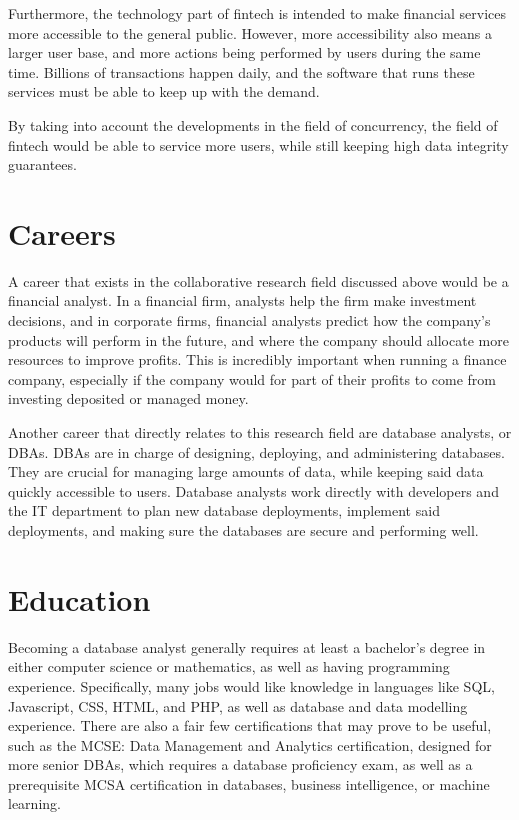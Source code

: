 \documentclass[jou]{apa7}
\begin{document}
Furthermore, the technology part of fintech is intended to make financial services more accessible to the general public.
However, more accessibility also means a larger user base,
and more actions being performed by users during the same time.
Billions of transactions happen daily,
and the software that runs these services must be able to keep up with the demand.
\autocite{foggSoftwareTestingFintech2020}

By taking into account the developments in the field of concurrency,
the field of fintech would be able to service more users,
while still keeping high data integrity guarantees.

\section{Careers}
A career that exists in the collaborative research field discussed above would be a financial analyst.
In a financial firm, analysts help the firm make investment decisions,
and in corporate firms,
financial analysts predict how the company's products will perform in the future,
and where the company should allocate more resources to improve profits.
This is incredibly important when running a finance company,
especially if the company would for part of their profits to come from investing deposited or managed money.
\autocite{segalBecomingFinancialAnalyst2020}

Another career that directly relates to this research field are database analysts, or DBAs.
DBAs are in charge of designing, deploying, and administering databases.
They are crucial for managing large amounts of data,
while keeping said data quickly accessible to users.
Database analysts work directly with developers and the IT department to plan new database deployments,
implement said deployments,
and making sure the databases are secure and performing well.
\autocite{jobheroDatabaseAnalystJob2020}

\section{Education}
Becoming a database analyst generally requires at least a bachelor's degree in either computer science or mathematics,
as well as having programming experience.
\autocite{governmentofcanadaDatabaseAnalystCanada2020}
Specifically, many jobs would like knowledge in languages like
SQL, Javascript, CSS, HTML, and PHP, as well as database and data modelling experience.
\autocite{jobheroDatabaseAnalystJob2020}
There are also a fair few certifications that may prove to be useful,
such as the MCSE: Data Management and Analytics certification,
designed for more senior DBAs,
which requires a database proficiency exam,
as well as a prerequisite MCSA certification in databases,
business intelligence,
or machine learning.
\autocite{aroraBestDataAnalytics2020}

\printbibliography
\end{document}
